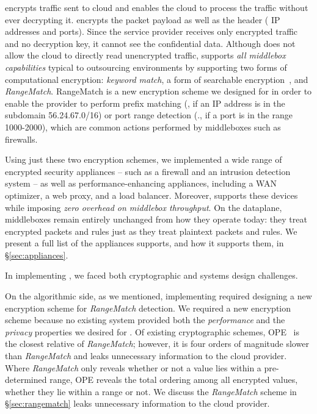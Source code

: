     \sys encrypts traffic sent to cloud and enables the cloud to process the traffic without ever decrypting it. \sys encrypts the packet payload as well as the header (\eg{} IP addresses and ports). Since the service provider receives only encrypted traffic and no decryption key, it cannot see the confidential data. 
    Although \sys does not allow the cloud to directly read unencrypted traffic, \sys supports {\it all middlebox capabilities} typical to outsourcing environments by supporting two forms of computational encryption: {\it keyword match}, a form of searchable encryption~\cite{blindbox}, and {\it RangeMatch}.
    RangeMatch is a new encryption scheme we designed for \sys in order to enable the provider to perform prefix matching (\eg{}, if an IP address is in the subdomain 56.24.67.0/16) or port range detection (\eg., if a port is in the range 1000-2000), which are common actions performed by middleboxes such as firewalls. 
    
    Using just these two encryption schemes, we implemented a wide range of encrypted security appliances -- such as a firewall and an intrusion detection system -- as well as performance-enhancing appliances, including a WAN optimizer, a web proxy, and a load balancer. 
    Moreover, \sys supports these devices while imposing {\it zero overhead on middlebox throughput}.
    On the dataplane, middleboxes remain entirely unchanged from how they operate today: they treat encrypted packets and rules just as they treat plaintext packets and rules.
    We present a full list of the appliances \sys supports, and how it supports them, in \S\ref{sec:appliances}.


    In implementing \sys, we faced both cryptographic and systems design challenges. 

    On the algorithmic side, as we mentioned, implementing \sys required designing a new encryption scheme for {\it RangeMatch} detection.
    We required a new encryption scheme because no existing system provided both the {\it performance} and the {\it privacy} properties we desired for \sys.
    Of existing cryptographic schemes, OPE~\cite{cryptdb} is the closest relative of {\it RangeMatch}; however, it is four orders of magnitude slower than {\it RangeMatch} and leaks unnecessary information to the cloud provider.
    Where {\em RangeMatch} only reveals whether or not a value lies within a pre-determined range, OPE reveals the total ordering among all encrypted values, whether they lie within a range or not.
    We discuss the {\em RangeMatch} scheme in \S\ref{sec:rangematch} leaks unnecessary information to the cloud provider.

